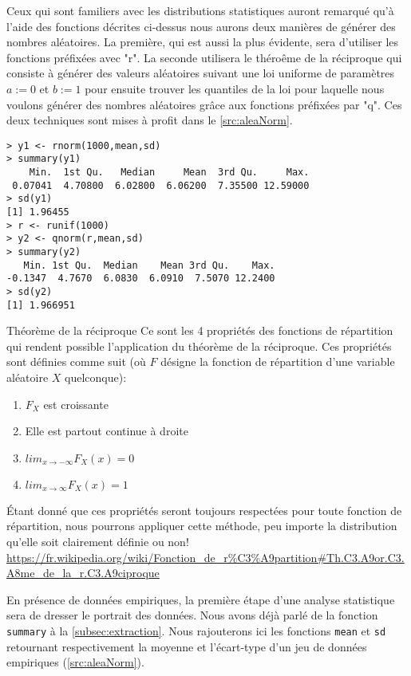 Ceux qui sont familiers avec les distributions statistiques auront remarqué qu'à l'aide des fonctions décrites ci-dessus nous aurons deux manières de générer des nombres aléatoires. La première, qui est aussi la plus évidente, sera d'utiliser les fonctions préfixées avec "r". La seconde utilisera le théroême de la réciproque qui consiste à générer des valeurs aléatoires suivant une loi uniforme de paramètres $a := 0$ et $b := 1$ pour ensuite trouver les quantiles de la loi pour laquelle nous voulons générer des nombres aléatoires grâce aux fonctions préfixées par "q". Ces deux techniques sont mises à profit dans le \autoref{src:aleaNorm}. \\

\begin{lstlisting}[caption = Génération de nombres aléatoires,label=src:aleaNorm]
> y1 <- rnorm(1000,mean,sd)
> summary(y1)
    Min.  1st Qu.   Median     Mean  3rd Qu.     Max.
 0.07041  4.70800  6.02800  6.06200  7.35500 12.59000
> sd(y1)
[1] 1.96455
> r <- runif(1000)
> y2 <- qnorm(r,mean,sd)
> summary(y2)
   Min. 1st Qu.  Median    Mean 3rd Qu.    Max.
-0.1347  4.7670  6.0830  6.0910  7.5070 12.2400
> sd(y2)
[1] 1.966951
\end{lstlisting}

\begin{moreInfo}{Théorème de la réciproque}
	Ce sont les 4 propriétés des fonctions de répartition qui rendent possible l'application du théorème de la réciproque. Ces propriétés sont définies comme suit (où $F$ désigne la fonction de répartition d'une variable aléatoire $X$ quelconque):
	\begin{enumerate}
		\item $F_X$ est croissante
		\item Elle est partout continue à droite
		\item $lim_{x \rightarrow -\infty} F_X(x) = 0$
		\item $lim_{x \rightarrow \infty} F_X(x) = 1$
	\end{enumerate}
	Étant donné que ces propriétés seront toujours respectées pour toute fonction de répartition, nous pourrons appliquer cette méthode, peu importe la distribution qu'elle soit clairement définie ou non! \\
	\url{https://fr.wikipedia.org/wiki/Fonction_de_r%C3%A9partition#Th.C3.A9or.C3.A8me_de_la_r.C3.A9ciproque}
\end{moreInfo}

En présence de données empiriques, la première étape d'une analyse statistique sera de dresser le portrait des données. Nous avons déjà parlé de la fonction \texttt{summary} à la \autoref{subsec:extraction}. Nous rajouterons ici les fonctions \texttt{mean} et \texttt{sd} retournant respectivement la moyenne et l'écart-type d'un jeu de données empiriques (\autoref{src:aleaNorm}). \\

